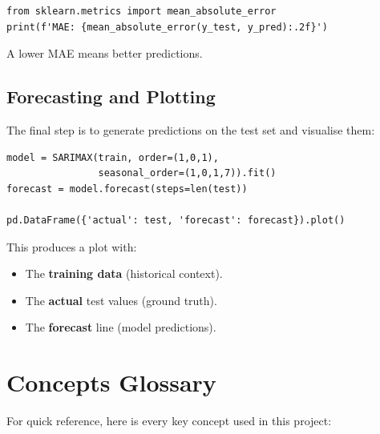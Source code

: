 \documentclass[12pt, a4paper]{article}
\begin{document}
\begin{lstlisting}
from sklearn.metrics import mean_absolute_error
print(f'MAE: {mean_absolute_error(y_test, y_pred):.2f}')
\end{lstlisting}

A lower MAE means better predictions.

\subsection{Forecasting and Plotting}
The final step is to generate predictions on the test set and visualise them:

\begin{lstlisting}
model = SARIMAX(train, order=(1,0,1),
                seasonal_order=(1,0,1,7)).fit()
forecast = model.forecast(steps=len(test))

pd.DataFrame({'actual': test, 'forecast': forecast}).plot()
\end{lstlisting}

This produces a plot with:
\begin{itemize}
    \item The \textbf{training data} (historical context).
    \item The \textbf{actual} test values (ground truth).
    \item The \textbf{forecast} line (model predictions).
\end{itemize}

\section{Concepts Glossary}

For quick reference, here is every key concept used in this project:
\end{document}
